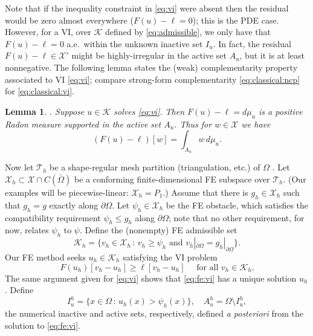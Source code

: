\documentclass[]{interact}
\theoremstyle{plain}%
\newtheorem{lemma}[theorem]{Lemma}
\theoremstyle{definition}
\theoremstyle{remark}
\newcommand{\cK}{\mathcal{K}}
\newcommand{\cT}{\mathcal{T}}
\newcommand{\cX}{\mathcal{X}}
\begin{document}
Note that if the inequality constraint in \eqref{eq:vi} were absent then the residual would be zero almost everywhere ($F(u)-\ell=0$); this is the PDE case.  However, for a VI, over $\cK$ defined by \eqref{eq:admissible}, we only have that $F(u)-\ell=0$ a.e.~within the unknown inactive set $I_u$.  In fact, the residual $F(u)-\ell\in \cX'$ might be highly-irregular in the active set $A_u$, but it is at least nonnegative.  The following lemma states the (weak) complementarity property associated to VI \eqref{eq:vi}; compare strong-form complementarity \eqref{eq:classical:ncp} for \eqref{eq:classical:vi}.

\begin{lemma} \label{lem:measure}\cite[Theorem II.6.9]{KinderlehrerStampacchia1980}.  Suppose $u\in \cK$ solves \eqref{eq:vi}.  Then $F(u)-\ell=d\mu_u$ is a positive Radon measure supported in the active set $A_u$.  Thus for $w\in\cX$ we have
\begin{equation}
(F(u)-\ell)[w] = \int_{A_u} w\, d\mu_u. \label{eq:measure}
\end{equation}
\end{lemma}

Now let $\cT_h$ be a shape-regular mesh partition (triangulation, etc.) of $\Omega$ \cite{AinsworthOden2000,ElmanSilvesterWathen2014}.  Let $\cX_h \subset \cX \cap C(\bar\Omega)$ be a conforming finite-dimensional FE subspace over $\cT_h$.  (Our examples will be piecewise-linear: $\cX_h=P_1$.)  Assume that there is $g_h\in\cX_h$ such that $g_h=g$ exactly along $\partial \Omega$.  Let $\psi_h \in \cX_h$ be the FE obstacle, which satisfies the compatibility requirement $\psi_h \le g_h$ along $\partial\Omega$; note that no other requirement, for now, relates $\psi_h$ to $\psi$.  Define the (nonempty) FE admissible set
\begin{equation} \label{eq:fe:admissible}
\cK_h = \{v_h \in \cX_h \,:\, v_h \ge \psi_h \text{ and } v_h|_{\partial \Omega} = g_h|_{\partial\Omega}\}.
\end{equation}
Our FE method seeks $u_h\in\cK_h$ satisfying the VI problem
\begin{equation} \label{eq:fe:vi}
F(u_h)[v_h - u_h] \ge \ell[v_h - u_h] \quad \text{ for all } v_h \in \cK_h.
\end{equation}
The same argument given for \eqref{eq:vi} shows that \eqref{eq:fe:vi} has a unique solution $u_h$.  Define
\begin{equation}
  I_u^h = \{x \in \Omega \,:\, u_h(x) > \psi_h(x)\}, \quad A_u^h = \Omega \setminus I_u^h, \label{eq:fe:sets}
\end{equation}
the numerical inactive and active sets, respectively, defined \emph{a posteriori} from the solution to \eqref{eq:fe:vi}.
\end{document}
